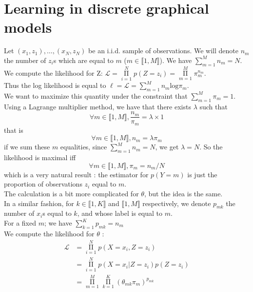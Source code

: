 \documentclass[11pt,a4paper]{article}
\begin{document}
\section{Learning in discrete graphical models}

Let $(x_1, z_1), \ldots, (x_N, z_N)$ be an i.i.d. sample of observations. We will denote $n_m$ the number of $z_i$s which are equal to $m$ ($m \in \llbracket 1, M \rrbracket$). We have $\sum\limits_{m=1}^{M} n_m = N$.
\\We compute the likelihood for Z: $\mathcal{L} = \mathop{\Pi}\limits_{i=1}^N p(Z = z_i) = \mathop{\Pi}\limits_{m=1}^M \pi_m^{n_m}$.
\\Thus the log likelihood is equal to $\ell = \mathcal{L} = \sum\limits_{m=1}^M n_m \mathrm{log} \pi_m$.
\\We want to maximize this quantity under the constraint that $\sum\limits_{m=1}^{M} \pi_m = 1$. Using a Lagrange multiplier method, we have that there exists $\lambda$ such that $$\forall m \in \llbracket 1, M \rrbracket, \frac{n_m}{\pi_m} = \lambda \times 1$$
that is $$\forall m \in \llbracket 1, M \rrbracket, n_m = \lambda \pi_m$$
if we sum these $m$ equalities, since $\sum\limits_{m=1}^{M} n_m = N$, we get $\lambda = N$.
So the likelihood is maximal iff $$\forall m \in \llbracket 1, M \rrbracket,  \pi_m = n_m/N$$
which is a very natural result : the estimator for $p(Y=m)$ is just the proportion of observations $z_i$ equal to $m$.
\\[5mm]The calculation is a bit more complicated for $\theta$, but the idea is the same.
\\In a similar fashion, for $k \in \llbracket 1, K \rrbracket$ and $\llbracket 1, M \rrbracket$ respectively, we denote $p_{mk}$ the number of $x_i$s equal to $k$, and whose label is equal to $m$. 
\\For a fixed $m$; we have $\sum\limits_{k=1}^{K}  p_{mk} = n_m$
\\We compute the likelihood for $\theta$ : 
$$\begin{aligned} \mathcal{L} &= \mathop{\Pi}\limits_{i=1}^N p(X = x_i, Z = z_i) \\
 &= \mathop{\Pi}\limits_{i=1}^N p(X=x_i | Z= z_i) p(Z=z_i)\\
 & = \mathop{\Pi}\limits_{m=1}^M  \mathop{\Pi}\limits_{k=1}^K (\theta_{m k} \pi_m)^{p_{mk}} \\
 \end{aligned}$$
\end{document}
